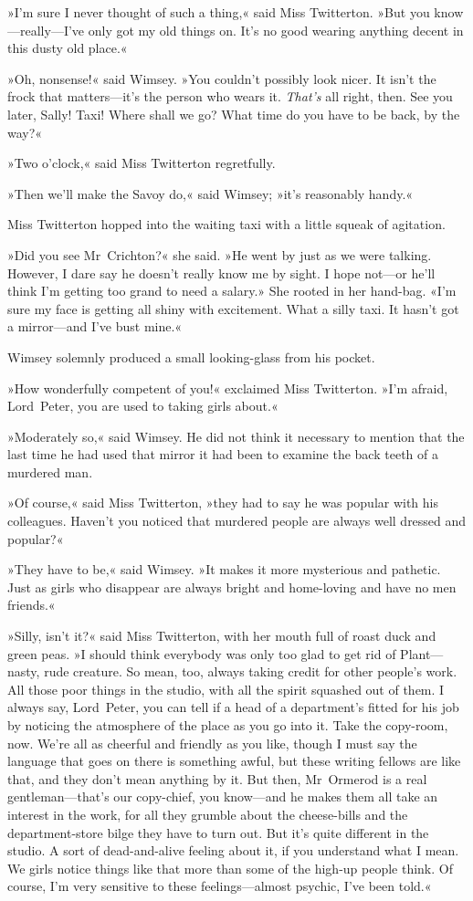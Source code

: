 »I'm sure I never thought of such a thing,« said Miss Twitterton. »But you know—really—I've only got my old things on. It's no good wearing anything decent in this dusty old place.«

»Oh, nonsense!« said Wimsey. »You couldn't possibly look nicer. It isn't the frock that matters—it's the person who wears it. \textit{That's} all right, then. See you later, Sally! Taxi! Where shall we go? What time do you have to be back, by the way?«

»Two o'clock,« said Miss Twitterton regretfully.

»Then we'll make the Savoy do,« said Wimsey; »it's reasonably handy.«

Miss Twitterton hopped into the waiting taxi with a little squeak of agitation.

»Did you see Mr~Crichton?« she said. »He went by just as we were talking. However, I dare say he doesn't really know me by sight. I hope not—or he'll think I'm getting too grand to need a salary.» She rooted in her hand-bag. «I'm sure my face is getting all shiny with excitement. What a silly taxi. It hasn't got a mirror—and I've bust mine.«

Wimsey solemnly produced a small looking-glass from his pocket.

»How wonderfully competent of you!« exclaimed Miss Twitterton. »I'm afraid, Lord~Peter, you are used to taking girls about.«

»Moderately so,« said Wimsey. He did not think it necessary to mention that the last time he had used that mirror it had been to examine the back teeth of a murdered man.

»Of course,« said Miss Twitterton, »they had to say he was popular with his colleagues. Haven't you noticed that murdered people are always well dressed and popular?«

»They have to be,« said Wimsey. »It makes it more mysterious and pathetic. Just as girls who disappear are always bright and home-loving and have no men friends.«

»Silly, isn't it?« said Miss Twitterton, with her mouth full of roast duck and green peas. »I should think everybody was only too glad to get rid of Plant—nasty, rude creature. So mean, too, always taking credit for other people's work. All those poor things in the studio, with all the spirit squashed out of them. I always say, Lord~Peter, you can tell if a head of a department's fitted for his job by noticing the atmosphere of the place as you go into it. Take the copy-room, now. We're all as cheerful and friendly as you like, though I must say the language that goes on there is something awful, but these writing fellows are like that, and they don't mean anything by it. But then, Mr~Ormerod is a real gentleman—that's our copy-chief, you know—and he makes them all take an interest in the work, for all they grumble about the cheese-bills and the department-store bilge they have to turn out. But it's quite different in the studio. A sort of dead-and-alive feeling about it, if you understand what I mean. We girls notice things like that more than some of the high-up people think. Of course, I'm very sensitive to these feelings—almost psychic, I've been told.«

